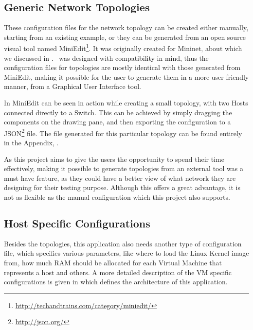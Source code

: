 \subsection{Generic Network Topologies}
\label{sub-sec:generic-network-topologies}

These configuration files for the network topology can be created either manually, starting from an existing example, or they can be generated from an open source visual tool named MiniEdit\footnote{\url{http://techandtrains.com/category/miniedit/}}.
It was originally created for Mininet, about which we discussed in .
\project\ was designed with compatibility in mind, thus the configuration files for topologies are mostly identical with those generated from MiniEdit, making it possible for the user to generate them in a more user friendly manner, from a Graphical User Interface tool.


In  MiniEdit can be seen in action while creating a small topology, with two Hosts connected directly to a Switch.
This can be achieved by simply dragging the components on the drawing pane, and then exporting the configuration to a JSON\footnote{\url{http://json.org/}} file.
The file generated for this particular topology can be found entirely in the Appendix, .

As this project aims to give the users the opportunity to spend their time effectively, making it possible to generate topologies from an external tool was a must have feature, as they could have a better view of what network they are designing for their testing purpose.
Although this offers a great advantage, it is not as flexible as the manual configuration which this project also supports.

\subsection{Host Specific Configurations}
\label{sub-sec:host-specific-configurations}

Besides the topologies, this application also needs another type of configuration file, which specifies various parameters, like where to load the Linux Kernel image from, how much RAM should be allocated for each Virtual Machine that represents a host and others.
A more detailed description of the VM specific configurations is given in  which defines the architecture of this application.

